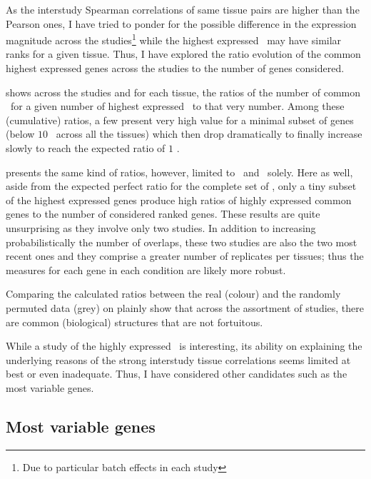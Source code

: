 As the interstudy Spearman correlations of same tissue pairs
are higher than the Pearson ones,
I have tried to ponder for the possible difference in the expression magnitude
across the studies\footnote{Due to particular batch effects in each study}
while the highest expressed \pc\ may have similar ranks
for a given tissue.
Thus, I have explored the ratio evolution of the common highest expressed
genes across the studies to the number of genes considered.

 shows across the studies and for each tissue,
the ratios of the number of
common \pcgs\ for a given number of highest expressed \pcgs\
to that very number.
Among these (cumulative) ratios,
a few present very high value for
a minimal subset of genes (below $10$ \FPKM\ across all the tissues)
which then drop dramatically to finally increase slowly
to reach the expected ratio of $1$ \FPKM{}.
\begin{comment}
as the \pcgs\ set across the studies is identical.
\end{comment}

 presents the same kind of ratios,
however, limited to \uhlen\ and \gtex\ solely.
Here as well, aside from the expected perfect ratio for the complete set of
\pcgs,
only a tiny subset of the highest expressed genes produce high ratios of
highly expressed common genes to the number of considered ranked genes.
These results are quite unsurprising as they involve only two studies.
In addition to increasing probabilistically the number of overlaps,
these two studies are also the two most recent ones
and they comprise a greater number of replicates per tissues;
thus the measures for each gene in each condition are likely more robust.

Comparing the calculated ratios between the real (colour) and
the randomly permuted data (grey)
on 
plainly show that across the assortment of studies,
there are common (biological) structures
that are not fortuitous.

While a study of the highly expressed \pcgs\ is interesting,
its ability on explaining the underlying reasons
of the strong interstudy tissue correlations seems limited at best
or even inadequate.
Thus, I have considered other candidates
such as the most variable genes.

\subsection{Most variable genes}

